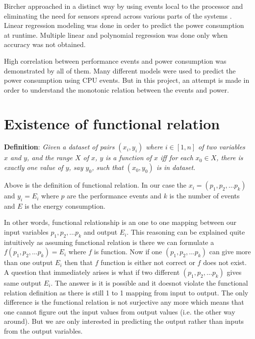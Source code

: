 Bircher approached in a distinct way by using events local to the processor and eliminating the need for sensors spread across various parts of the systems \cite{bircher2012complete}. Linear regression modeling was done in order to predict the power consumption at runtime. Multiple linear and polynomial regression was done only when accuracy was not obtained. 

High correlation between performance events and power consumption was demonstrated by all of them. Many different models were used to predict the power consumption using CPU events. But in this project, an attempt is made in order to understand the monotonic relation between the events and power.


\section{Existence of functional relation}

\textbf{Definition}: \textit{Given a dataset of pairs \((x_i, y_i)\) where \(i \in [1, n]\) of two variables \(x\) and \(y\), and the range \(X\) of \(x\), \(y\) is a function of \(x\) iff for each \(x_0 \in X\), there is exactly one value of \(y\), say \(y_0\), such that \((x_0, y_0)\) is in dataset.}~\cite{zembowicz1993testing}

Above is the definition of functional relation. In our case the \(x_i = (p_1, p_2, \ldots p_k)\) and \(y_i = E_i\) where \(p\) are the performance events and \(k\) is the number of events and \(E\) is the energy consumption.

In other words, functional relationship is an one to one mapping between our input variables \(p_1, p_2, \ldots p_k\) and output \(E_i\). This reasoning can be explained quite intuitively as assuming functional relation is there we can formulate a \(f(p_1, p_2, \ldots p_k) = E_i\) where \(f\) is function. Now if one \((p_1, p_2, \ldots p_k)\) can give more than one output \(E_i\) then that \(f\) function is either not correct or \(f\) does not exist. A question that immediately arises is what if two different \((p_1, p_2, \ldots p_k)\) gives same output \(E_i\). The answer is it is possible and it doesnot violate the functional relation definition as there is still 1 to 1 mapping from input to output. The only difference is the functional relation is not surjective any more which means that one cannot figure out the input values from output values (i.e. the other way around). But we are only interested in predicting the output rather than inputs from the output variables.

